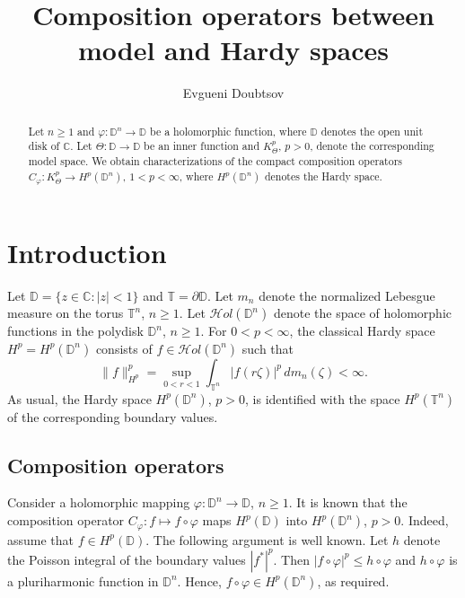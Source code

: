 \documentclass{amsart}
\numberwithin{equation}{section}
\theoremstyle{definition}
\newcommand{\meal}{m_n}
\newcommand{\za}{\zeta}
\newcommand{\ph}{\varphi}
\newcommand{\cph}{C_\varphi}
\newcommand{\hol}{\mathcal{H}ol}
\newcommand{\Dbb}{\mathbb D}
\newcommand{\Tbb}{\mathbb T}
\newcommand{\tn}{\mathbb{T}^n}
\newcommand{\dn}{\mathbb{D}^n}
\newcommand{\Cbb}{\mathbb C}
\begin{document}
\title[Composition operators]{Composition operators between model and Hardy spaces}
\author{Evgueni Doubtsov}
\address{St.~Petersburg Department
of Steklov Mathematical Institute, Fontanka 27, St.~Petersburg 191023, Russia}




\begin{abstract}
Let $n\ge 1$ and $\varphi: \mathbb{D}^n\to\mathbb{D}$ be a holomorphic function,
where $\mathbb{D}$ denotes the open unit disk of $\mathbb{C}$.
Let $\Theta: \mathbb{D} \to \mathbb{D}$ be an inner function and
$K^p_\Theta$, $p>0$, denote the corresponding model space.
We obtain characterizations of the compact composition operators
$C_\varphi: K^p_\Theta \to H^p(\mathbb{D}^n)$, $1<p<\infty$,
where $H^p(\mathbb{D}^n)$ denotes the Hardy space.
\end{abstract}

\maketitle

\section{Introduction}

Let $\Dbb = \{z\in \Cbb: |z|<1\}$ and $\Tbb = \partial \Dbb$.
Let $\meal$ denote the normalized Lebesgue measure on the torus $\tn$, $n\ge 1$.
%
Let $\hol(\dn)$ denote the space of holomorphic functions in the polydisk $\dn$, $n\ge 1$.
For $0<p<\infty$, the classical Hardy space $H^p=H^p(\dn)$ consists of
$f\in \hol(\dn)$ such that
\[
\|f\|_{H^p}^p = \sup_{0<r<1} \int_{\tn} |f(r\za)|^p\, d\meal(\za) < \infty.
\]
As usual, the Hardy space $H^p(\dn)$, $p>0$, is identified with the space
$H^p(\tn)$ of the corresponding boundary values.


\subsection{Composition operators}
Consider a holomorphic mapping $\ph: \dn\to\Dbb$, $n\ge 1$.
It is known that the composition operator $\cph: f\mapsto f\circ\ph$ maps $H^p(\Dbb)$
into $H^p(\dn)$, $p>0$. Indeed, assume that $f\in H^p(\Dbb)$.
The following argument is well known.
Let $h$ denote the Poisson integral of the boundary values $|f^\ast|^p$.
Then $|f\circ \ph|^p \le h\circ\ph$ and $h\circ\ph$ is a pluriharmonic function in $\dn$.
Hence, $f\circ\ph \in H^p(\dn)$,
as required.
\end{document}
